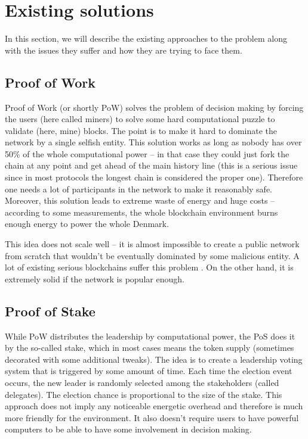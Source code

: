 \section{Existing solutions}

In this section, we will describe the existing approaches to the problem along
with the issues they suffer and how they are trying to face them.

\subsection{Proof of Work}

Proof of Work (or shortly PoW) solves the problem of decision making by forcing the
users (here called miners) to solve some hard computational puzzle to validate
(here, mine) blocks\cite{bitcoin}.
The point is to make it hard to dominate the network by a
single selfish entity. This solution works as long as nobody has over 50\% of the whole
computational power – in that case they could just fork the chain at any point
and get ahead of the main history line (this is a serious issue since in most
protocols the longest chain is considered the proper one). Therefore one needs a
lot of participants in the network to make it reasonably safe. Moreover, this
solution leads to extreme waste of energy and huge costs – according to some
measurements, the whole blockchain environment burns enough energy to power
the whole Denmark\cite{bitcoin_energy}.

This idea does not scale well – it is almost impossible to create a public
network from scratch that wouldn't be eventually dominated by some malicious
entity. A lot of existing serious blockchains suffer this problem
\cite{51attack}. On the other hand, it is extremely solid if
the network is popular enough.

\subsection{Proof of Stake}

While PoW distributes the leadership by computational power, the PoS does it by
the so-called stake, which in most cases means the token supply (sometimes decorated
with some additional tweaks)\cite{peercoin}\cite{cryptocurr_without_pow}.
The idea is to create a leadership voting system
that is triggered by some amount of time. Each time the election event occurs,
the new leader is randomly selected among the stakeholders (called delegates).
The election chance is proportional to the size of the stake. This approach does
not imply any noticeable energetic overhead and therefore is much more friendly for the
environment. It also doesn't require users to have powerful computers to be able to
have some involvement in decision making.


